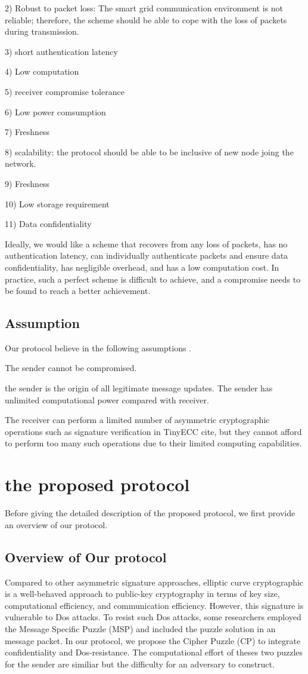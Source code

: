 \documentclass[lnicst,sechang,a4paper]{svmultln}
\begin{document}
 	2) Robust to packet loss: The smart grid communication environment is not reliable; therefore, the scheme should be able to cope with the loss of packets during transmission.
 	
 	3) short authentication latency
 	
 	4) Low computation 
 	
 	5) receiver compromise tolerance
 	
 	6) Low power comsumption 
 	
 	7) Freshness
 	
 	8) scalability: the protocol should be able to be inclusive of new node joing the network.
 	
 	9) Freshness
 	
 	10) Low storage requirement
 	
 	11) Data confidentiality
 	
 	Ideally, we would like a scheme that recovers from any loss of packets, has no authentication latency, can individually authenticate packets and ensure data confidentiality, has negligible overhead, and has a low computation cost. In practice, such a perfect scheme is difficult to achieve, and a compromise needs to be found to reach a better achievement.
 	
\subsection{Assumption}
Our protocol believe in the following assumptions . 

The sender cannot be compromised.

the sender is the origin of all legitimate message updates. The sender has unlimited computational power compared with receiver.

The receiver can perform a limited number of asymmetric cryptographic operations such as signature verification in TinyECC cite{}, but they cannot afford to perform too many such operations due to their limited computing capabilities.

\section{the proposed protocol}
Before giving the detailed description of the proposed protocol, we first provide an overview of our protocol.
\subsection{ Overview of Our protocol}
Compared to other asymmetric signature approaches, elliptic curve cryptographic is a well-behaved approach to public-key cryptography in terms of key size, computational efficiency, and communication efficiency. However, this signature is vulnerable to Dos attacks. To resist such Dos attacks, some researchers employed the Message Specific Puzzle (MSP) and included the puzzle solution in an message packet. In our protocol, we propose the Cipher Puzzle (CP) to integrate confidentiality and Dos-resistance. The computational effort of theses two puzzles for the sender are similiar but the difficulty for an adversary to construct.
\end{document}
